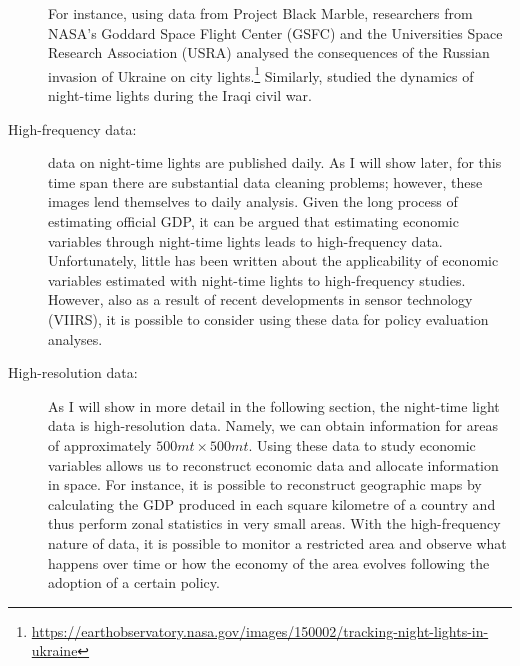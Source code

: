 \begin{description}
For instance, using data from Project Black Marble, researchers from NASA's Goddard Space Flight Center (GSFC) and the Universities Space Research Association (USRA) analysed the consequences of the Russian invasion of Ukraine on city lights.\footnote{\url{https://earthobservatory.nasa.gov/images/150002/tracking-night-lights-in-ukraine}}
Similarly, \citet{li2018night} studied the dynamics of night-time lights during the Iraqi civil war.
\item[High-frequency data:] data on night-time lights are published daily. As I will show later, for this time span there are substantial data cleaning problems; however, these images lend themselves to daily analysis. Given the long process of estimating official GDP, it can be argued that estimating economic variables through night-time lights leads to high-frequency data. Unfortunately, little has been written about the applicability of economic variables estimated with night-time lights to high-frequency studies. However, also as a result of recent developments in sensor technology (VIIRS), it is possible to consider using these data for policy evaluation analyses.
\item[High-resolution data:]
As I will show in more detail in the following section, the night-time light data is high-resolution data. Namely, we can obtain information for areas of approximately $500mt \times 500mt$.
Using these data to study economic variables allows us to reconstruct economic data and allocate information in space. For instance, it is possible to reconstruct geographic maps by calculating the GDP produced in each square kilometre of a country and thus perform zonal statistics in very small areas. With the high-frequency nature of data, it is possible to monitor a restricted area and observe what happens over time or how the economy of the area evolves following the adoption of a certain policy.
\end{description}
